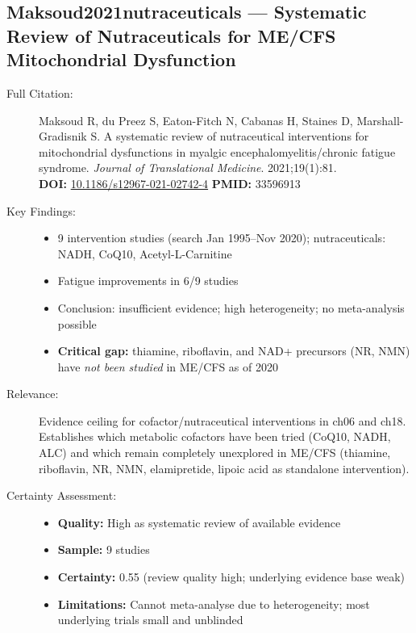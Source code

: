 \subsection*{Maksoud2021nutraceuticals --- Systematic Review of Nutraceuticals for ME/CFS Mitochondrial Dysfunction}
\begin{description}
    \item[Full Citation:] Maksoud R, du Preez S, Eaton-Fitch N, Cabanas H, Staines D, Marshall-Gradisnik S. A systematic review of nutraceutical interventions for mitochondrial dysfunctions in myalgic encephalomyelitis/chronic fatigue syndrome. \textit{Journal of Translational Medicine}. 2021;19(1):81.\\
    \textbf{DOI:} \href{https://doi.org/10.1186/s12967-021-02742-4}{10.1186/s12967-021-02742-4} \quad \textbf{PMID:} 33596913
    \item[Key Findings:]
    \begin{itemize}
        \item 9 intervention studies (search Jan 1995--Nov 2020); nutraceuticals: NADH, CoQ10, Acetyl-L-Carnitine
        \item Fatigue improvements in 6/9 studies
        \item Conclusion: insufficient evidence; high heterogeneity; no meta-analysis possible
        \item \textbf{Critical gap:} thiamine, riboflavin, and NAD+ precursors (NR, NMN) have \emph{not been studied} in ME/CFS as of 2020
    \end{itemize}
    \item[Relevance:] Evidence ceiling for cofactor/nutraceutical interventions in ch06 and ch18. Establishes which metabolic cofactors have been tried (CoQ10, NADH, ALC) and which remain completely unexplored in ME/CFS (thiamine, riboflavin, NR, NMN, elamipretide, lipoic acid as standalone intervention).
    \item[Certainty Assessment:]
    \begin{itemize}
        \item \textbf{Quality:} High as systematic review of available evidence
        \item \textbf{Sample:} 9 studies
        \item \textbf{Certainty:} 0.55 (review quality high; underlying evidence base weak)
        \item \textbf{Limitations:} Cannot meta-analyse due to heterogeneity; most underlying trials small and unblinded
    \end{itemize}
\end{description}

